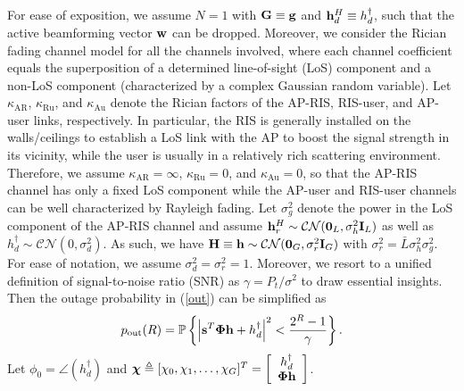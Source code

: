 \documentclass[draftclsnofoot,onecolumn,12pt]{IEEEtran}
\newcommand{\revh}[1]{{\color{black}#1}} %
\newcommand{\revh}[1]{#1}
\begin{document}
For ease of exposition, we assume $N=1$ with ${\bf G}\equiv {\bf g}$ and ${\bf h}_d^H \equiv {h}_d^\dagger$, such that the active beamforming vector $\bf w$ can be dropped. 
\revh{Moreover, we consider the Rician fading channel model for all the channels involved, where each channel coefficient equals the superposition of a determined line-of-sight (LoS) component and a non-LoS component (characterized by a complex Gaussian random variable). 
Let $\kappa_\text{AR}$, $\kappa_\text{Ru}$, and $\kappa_\text{Au}$ denote the Rician factors of the AP-RIS, RIS-user, and AP-user links, respectively. 
In particular, the RIS is generally installed on the walls/ceilings to establish a LoS link with the AP to boost the signal strength in its vicinity, while the user is usually in a relatively rich scattering environment. Therefore, we assume $\kappa_\text{AR}=\infty$, $\kappa_\text{Ru}=0$, and $\kappa_\text{Au}=0$, so that the AP-RIS channel has only a fixed LoS component while the AP-user and RIS-user channels can be well characterized by Rayleigh fading. 
Let $\sigma_g^2$ denote the power in the LoS component of the AP-RIS channel and assume ${\bf h}_r^H \sim \mathcal{CN}({\bf 0}_L, \sigma_h^2{\bf I}_L)$ as well as ${h}_d^\dagger\sim \mathcal{CN}({0}, \sigma_d^2)$.} 
As such, 
we have ${\bf H}\equiv {\bf h}\sim \mathcal{CN}({\bf 0}_G, \sigma_r^2{\bf I}_G)$ with $\sigma_r^2=\bar{L}\sigma_h^2\sigma_g^2$. 
For ease of notation, we assume $\sigma_d^2=\sigma_r^2=1$. 
Moreover, we resort to a unified definition of signal-to-noise ratio (SNR) as $\gamma = P_t/\sigma^2$ to draw essential insights.
Then the outage probability in (\ref{out}) can be simplified as
\begin{align}
p_\text{out} (R) = \mathbb{P} \left\{ 
\left| {\bf s}^T {\bm \Phi} {{\bf h}} + {{h}}_d^\dagger \right|^2 < \frac{2^R -1}{\gamma}\right\}.
\end{align}
Let $\phi_0 = \angle ({ h}_d^\dagger)$ and ${\bm \chi}\triangleq [ \chi_0,\chi_1,\ldots,\chi_G]^T=\left[ {\begin{array}{*{20}{c}}
	{ { h}_d^\dagger }  \\
	{ {\bm \Phi}{\bf h} } 
	\end{array}} \right]$. 
\end{document}
